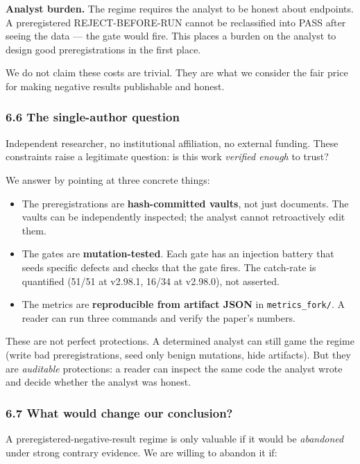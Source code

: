 \documentclass[
]{article}
\providecommand{\tightlist}{%
  \setlength{\itemsep}{0pt}\setlength{\parskip}{0pt}}
\begin{document}
\textbf{Analyst burden.} The regime requires the analyst to be honest
about endpoints. A preregistered REJECT-BEFORE-RUN cannot be
reclassified into PASS after seeing the data --- the gate would fire.
This places a burden on the analyst to design good preregistrations in
the first place.

We do not claim these costs are trivial. They are what we consider the
fair price for making negative results publishable and honest.

\subsubsection{6.6 The single-author
question}\label{the-single-author-question}

Independent researcher, no institutional affiliation, no external
funding. These constraints raise a legitimate question: is this work
\emph{verified enough} to trust?

We answer by pointing at three concrete things:

\begin{itemize}
\tightlist
\item
  The preregistrations are \textbf{hash-committed vaults}, not just
  documents. The vaults can be independently inspected; the analyst
  cannot retroactively edit them.
\item
  The gates are \textbf{mutation-tested}. Each gate has an injection
  battery that seeds specific defects and checks that the gate fires.
  The catch-rate is quantified (51/51 at v2.98.1, 16/34 at v2.98.0), not
  asserted.
\item
  The metrics are \textbf{reproducible from artifact JSON} in
  \texttt{metrics\_fork/}. A reader can run three commands and verify
  the paper's numbers.
\end{itemize}

These are not perfect protections. A determined analyst can still game
the regime (write bad preregistrations, seed only benign mutations, hide
artifacts). But they are \emph{auditable} protections: a reader can
inspect the same code the analyst wrote and decide whether the analyst
was honest.

\subsubsection{6.7 What would change our
conclusion?}\label{what-would-change-our-conclusion}

A preregistered-negative-result regime is only valuable if it would be
\emph{abandoned} under strong contrary evidence. We are willing to
abandon it if:
\end{document}
